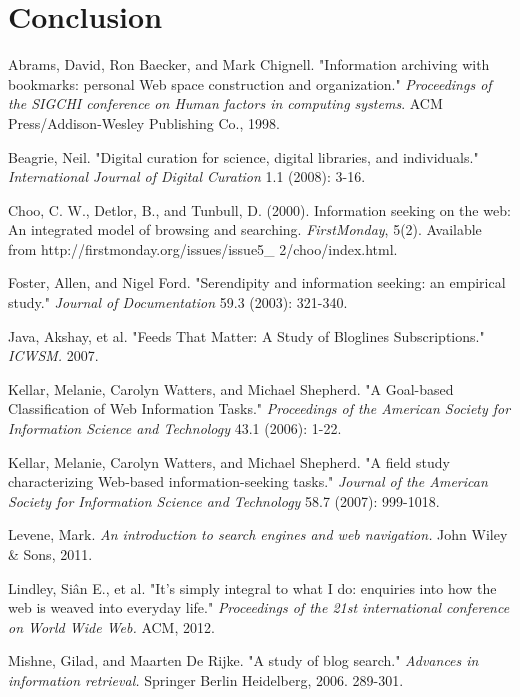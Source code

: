 \documentclass{casconpaper}
\begin{document}
{\section{Conclusion}
 
} %



{\begin{thebibliography}{9}
 Abrams, David, Ron Baecker, and Mark Chignell. "Information archiving with bookmarks: personal Web space construction and organization." \emph{Proceedings of the SIGCHI conference on Human factors in computing systems}. ACM Press/Addison-Wesley Publishing Co., 1998.


Beagrie, Neil. "Digital curation for science, digital libraries, and individuals." \emph{International Journal of Digital Curation} 1.1 (2008): 3-16.




Choo, C. W., Detlor, B., and Tunbull, D. (2000). Information seeking on the web: An integrated model of browsing and searching.  \emph{FirstMonday}, 5(2). Available from http://firstmonday.org/issues/issue5\_
2/choo/index.html.

Foster, Allen, and Nigel Ford. "Serendipity and information seeking: an empirical study." \emph{Journal of Documentation} 59.3 (2003): 321-340.

	Java, Akshay, et al. "Feeds That Matter: A Study of Bloglines Subscriptions." \emph{ ICWSM.} 2007.
   
 Kellar, Melanie, Carolyn Watters, and Michael Shepherd. "A Goal-based Classification of Web Information Tasks." \emph{Proceedings of the American Society for Information Science and Technology} 43.1 (2006): 1-22.

Kellar, Melanie, Carolyn Watters, and Michael Shepherd. "A field study characterizing Web-based information-seeking tasks." \emph{Journal of the American Society for Information Science and Technology} 58.7 (2007): 999-1018.

Levene, Mark.  \emph{An introduction to search engines and web navigation.} John Wiley \& Sons, 2011.

Lindley, Siân E., et al. "It's simply integral to what I do: enquiries into how the web is weaved into everyday life." \emph{Proceedings of the 21st international conference on World Wide Web.} ACM, 2012.

Mishne, Gilad, and Maarten De Rijke. "A study of blog search." \emph{Advances in information retrieval.} Springer Berlin Heidelberg, 2006. 289-301.


\end{thebibliography}}
\end{document}
